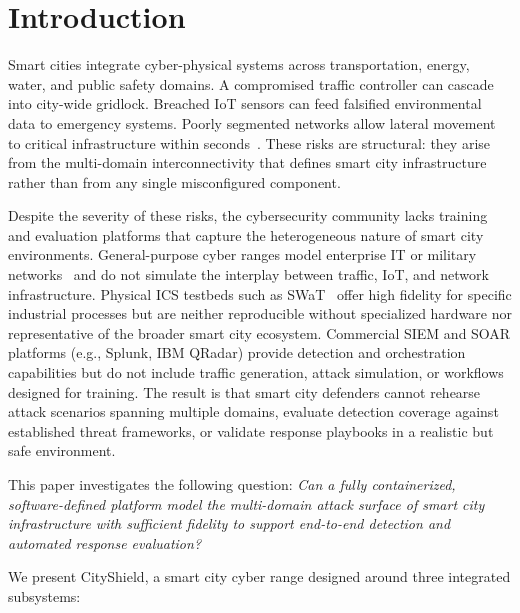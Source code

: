 \documentclass[conference,10pt]{IEEEtran}
\begin{document}
\section{Introduction}
\label{sec:introduction}

Smart cities integrate cyber-physical systems across transportation, energy, water, and public safety domains. A compromised traffic controller can cascade into city-wide gridlock. Breached IoT sensors can feed falsified environmental data to emergency systems. Poorly segmented networks allow lateral movement to critical infrastructure within seconds~\cite{braun2018}. These risks are structural: they arise from the multi-domain interconnectivity that defines smart city infrastructure rather than from any single misconfigured component.

Despite the severity of these risks, the cybersecurity community lacks training and evaluation platforms that capture the heterogeneous nature of smart city environments. General-purpose cyber ranges model enterprise IT or military networks~\cite{davis2013survey, vykopal2017kypo, yamin2020cyber} and do not simulate the interplay between traffic, IoT, and network infrastructure. Physical ICS testbeds such as SWaT~\cite{swat2016} offer high fidelity for specific industrial processes but are neither reproducible without specialized hardware nor representative of the broader smart city ecosystem. Commercial SIEM and SOAR platforms (e.g., Splunk, IBM QRadar) provide detection and orchestration capabilities but do not include traffic generation, attack simulation, or workflows designed for training. The result is that smart city defenders cannot rehearse attack scenarios spanning multiple domains, evaluate detection coverage against established threat frameworks, or validate response playbooks in a realistic but safe environment.

This paper investigates the following question: \emph{Can a fully containerized, software-defined platform model the multi-domain attack surface of smart city infrastructure with sufficient fidelity to support end-to-end detection and automated response evaluation?}

We present CityShield, a smart city cyber range designed around three integrated subsystems:
\end{document}
